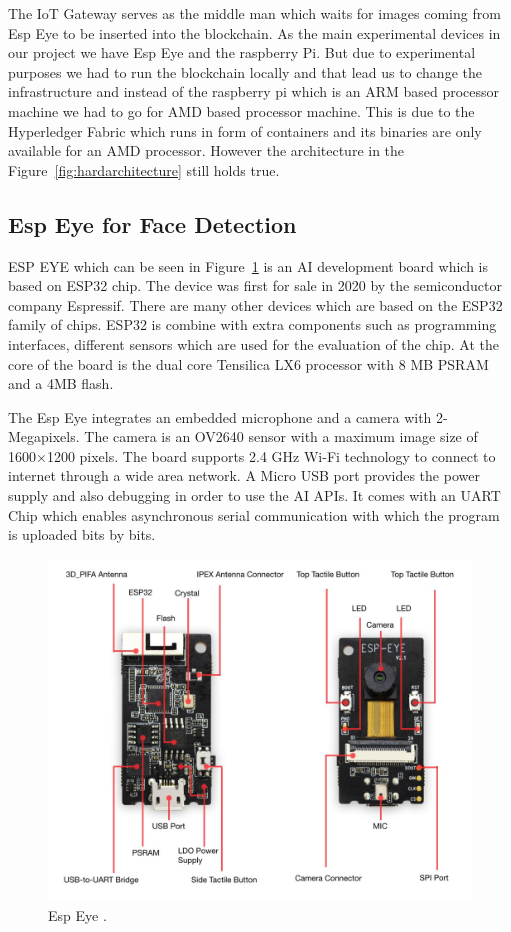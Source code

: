 The IoT Gateway serves as the middle man which waits for images coming from Esp Eye to be inserted into the blockchain. As the main experimental devices in our project we have Esp Eye and the raspberry Pi. But due to experimental purposes we had to run the blockchain locally and that lead us to change the infrastructure and instead of the raspberry pi which is an ARM based processor machine we had to go for AMD based processor machine. This is due to the Hyperledger Fabric which runs in form of containers and its binaries are only available for an AMD processor. However the architecture in the Figure~\ref{fig:hardarchitecture} still holds true. 


\subsection{Esp Eye for Face Detection}

ESP EYE which can be seen in Figure~\ref{fig:espeye} is an AI development board which is based on ESP32 chip. The device was first for sale in 2020 by the semiconductor company Espressif. There are many other devices which are based on the ESP32 family of chips. ESP32 is combine with extra components such as programming interfaces, different sensors which are used for the evaluation of the chip. 
At the core of the board is the dual core Tensilica LX6 processor with 8 MB PSRAM and a 4MB flash. 

The Esp Eye integrates an embedded microphone and a camera with 2-Megapixels. The camera is an OV2640 sensor with a maximum image size of 1600×1200 pixels. The board supports  2.4 GHz Wi-Fi technology to connect to internet through a wide area network. A Micro USB port provides the power supply and also debugging in order to use the AI APIs. It comes with an UART Chip which enables asynchronous serial communication with which the program is uploaded bits by bits. 
\begin{figure}[!htb]
    \centering
    \includegraphics[width=1\textwidth]{figures/espeye.png}
    \caption{Esp Eye \cite{espeyeimage}.}
    \label{fig:espeye}
\end{figure}


